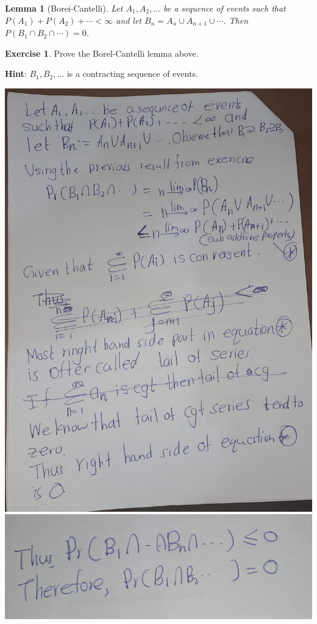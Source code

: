 \documentclass[
]{book}
\newtheorem{lemma}{Lemma}[chapter]
\theoremstyle{definition}
\theoremstyle{definition}
\theoremstyle{definition}
\newtheorem{exercise}{Exercise}[chapter]
\theoremstyle{definition}
\theoremstyle{remark}
\begin{document}
\begin{lemma}[Borei-Cantelli]
\protect\hypertarget{lem:unnamed-chunk-12}{}\label{lem:unnamed-chunk-12}Let \(A_1, A_2, \ldots\) be a sequence of events such that \(P(A_1) + P(A_2) + \cdots < \infty\)
and let \(B_n = A_n \cup A_{n+1} \cup \cdots\). Then \(P(B_1 \cap B_2 \cap \cdots) = 0\).
\end{lemma}

\begin{exercise}
\protect\hypertarget{exr:unnamed-chunk-13}{}\label{exr:unnamed-chunk-13}Prove the Borel-Cantelli lemma above.

\textbf{Hint}: \(B_1, B_2, \ldots\) is a contracting sequence of events.
\end{exercise}

\includegraphics[width=18cm,height=\textheight]{fig/fig3.jpg}
\includegraphics[width=18cm,height=\textheight]{fig/fig4.jpg}
\end{document}
